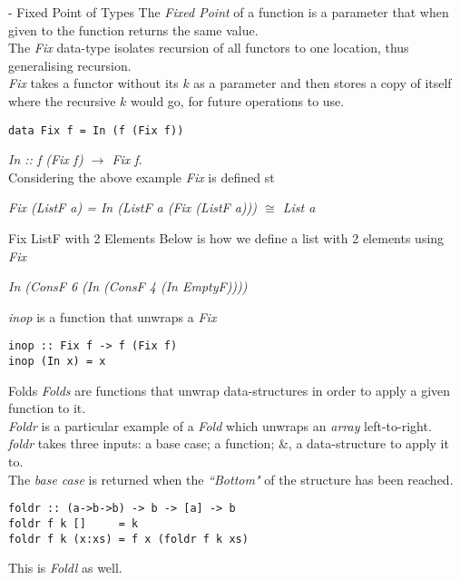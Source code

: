 \documentclass[11pt,a4paper]{article}
\begin{document}
\begin{definition}{{} - Fixed Point of Types}
The \textit{Fixed Point} of a function is a parameter that when given to the function returns the same value.\\
The \textit{Fix} data-type isolates recursion of all functors to one location, thus generalising recursion.\\
\textit{Fix} takes a functor without its $k$ as a parameter and then stores a copy of itself where the recursive $k$ would go, for future operations to use.\\
\begin{lstlisting}
data Fix f = In (f (Fix f))
\end{lstlisting}
\NB \textit{In :: f (Fix f) $\to$ Fix f}.\\
\NB Considering the above example \textit{Fix} is defined st
\begin{center}
\textit{Fix (ListF a) = In (ListF a (Fix (ListF a))) $\cong$ List a}
\end{center}
\end{definition}

\begin{example}{Fix ListF with 2 Elements}
Below is how we define a list with 2 elements using \textit{Fix}
\begin{center}
\textit{In (ConsF 6 (In (ConsF 4 (In EmptyF))))}
\end{center}
\end{example}

\begin{definition}{{}}
\textit{inop} is a function that unwraps a \textit{Fix}
\begin{lstlisting}
inop :: Fix f -> f (Fix f)
inop (In x) = x
\end{lstlisting}
\end{definition}

\begin{definition}{Folds}
\textit{Folds} are functions that unwrap data-structures in order to apply a given function to it.\\
\textit{Foldr} is a particular example of a \textit{Fold} which unwraps an \textit{array} left-to-right.\\
\textit{foldr} takes three inputs: a base case; a function; \&, a data-structure to apply it to.\\
The \textit{base case} is returned when the \textit{``Bottom"} of the structure has been reached.
\begin{lstlisting}
foldr :: (a->b->b) -> b -> [a] -> b
foldr f k []     = k
foldr f k (x:xs) = f x (foldr f k xs)
\end{lstlisting}
\NB This is \textit{Foldl} as well.
\end{definition}\\
\end{document}
